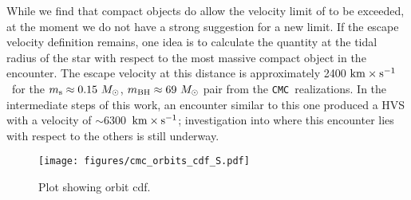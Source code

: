 \documentclass[twocolumn]{aastex631}
\newcommand{\kms}{${\rm km \times s^{-1}}$}
\newcommand{\CMC}{\texttt{CMC}}
\begin{document}
While we find that compact objects do allow the velocity limit of \citet{1991AJ....101..562L} to be exceeded, at the moment we do not have a strong suggestion for a new limit.
If the escape velocity definition remains, one idea is to calculate the quantity at the tidal radius of the star with respect to the most massive compact object in the encounter.
The escape velocity at this distance is approximately 2400 \kms\ for the $m_{\rm s}\approx0.15~M_\odot$, $m_{\rm BH}\approx69~M_\odot$ pair from the \CMC\ realizations.
In the intermediate steps of this work, an encounter similar to this one produced a HVS with a velocity of $\sim$6300~\kms; investigation into where this encounter lies with respect to the others is still underway.


\begin{figure}[ht!]
    \begin{centering}
        \texttt{[image: figures/cmc\_orbits\_cdf\_S.pdf]}
        \caption{
            Plot showing orbit cdf.
        }
        \label{fig:cmc_orbits_cdf}
    \end{centering}
\end{figure}


\end{document}
